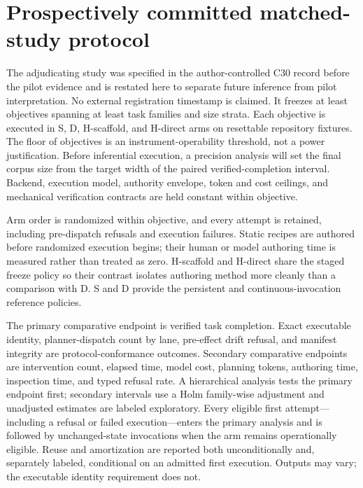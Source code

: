 \documentclass[11pt]{article}
\begin{document}
\section{Prospectively committed matched-study protocol}

The adjudicating study was specified in the author-controlled C30 record before
the pilot evidence and is restated here to separate future inference from
pilot interpretation. No external registration timestamp is claimed. It
freezes at least
\RegisteredObjectiveMinimum{} objectives spanning at least
\RegisteredTaskFamilyMinimum{} task families and
\RegisteredSizeStrataMinimum{} size strata.  Each objective is executed in S,
D, H-scaffold, and H-direct arms on resettable repository fixtures. The floor
of \RegisteredObjectiveMinimum{} objectives is an instrument-operability
threshold, not a power justification. Before inferential execution, a
precision analysis will set the final corpus size from the target width of the
paired verified-completion interval. Backend,
execution model, authority envelope, token and cost ceilings, and mechanical
verification contracts are held constant within objective.

Arm order is randomized within objective, and every attempt is retained,
including pre-dispatch refusals and execution failures.  Static recipes are
authored before randomized execution begins; their human or model authoring
time is measured rather than treated as zero.  H-scaffold and H-direct share
the staged freeze policy so their contrast isolates authoring method more
cleanly than a comparison with D.  S and D provide the persistent and
continuous-invocation reference policies.

The primary comparative endpoint is verified task completion. Exact executable
identity, planner-dispatch count by lane, pre-effect drift refusal, and
manifest integrity are protocol-conformance outcomes. Secondary comparative
endpoints are intervention count, elapsed time, model cost, planning tokens,
authoring time, inspection time, and typed refusal rate. A hierarchical
analysis tests the primary endpoint first; secondary intervals use a Holm
family-wise adjustment and unadjusted estimates are labeled exploratory.
Every eligible first attempt---including a refusal or failed
execution---enters the primary analysis and is followed by
\RegisteredRepeatCount{} unchanged-state invocations when the arm remains
operationally eligible. Reuse and amortization are reported both
unconditionally and, separately labeled, conditional on an admitted first
execution. Outputs may vary; the executable identity requirement does not.
\end{document}
